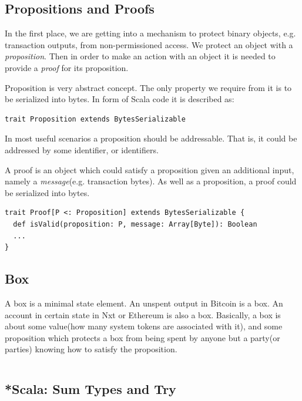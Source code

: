 \documentclass[]{report}   %
\begin{document}
\subsection{Propositions and Proofs}

In the first place, we are getting into a mechanism to protect binary objects, e.g. transaction outputs, from non-permissioned access. We protect an object with a \textit{proposition}. Then in order to make an action with an object it is needed to provide a \textit{proof} for its proposition. 

Proposition is very abstract concept. The only property we require from it is to be serialized into bytes. In form of Scala code it is described as:

\begin{lstlisting}
trait Proposition extends BytesSerializable
\end{lstlisting}

In most useful scenarios a proposition should be addressable. That is, it could be addressed by some identifier, or identifiers.

A proof is an object which could satisfy a proposition given an additional input, namely a \textit{message}(e.g. transaction bytes). As well as a proposition, a proof could be serialized into bytes. 

\begin{lstlisting}
trait Proof[P <: Proposition] extends BytesSerializable {
  def isValid(proposition: P, message: Array[Byte]): Boolean
  ...
}
\end{lstlisting}


\subsection{Box}

A box is a minimal state element. An unspent output in Bitcoin is a box. An account in certain state in Nxt or Ethereum is also a box. Basically, a box is about some value(how many system tokens are associated with it), and some proposition which protects a box from being spent by anyone but a party(or parties) knowing how to satisfy the proposition.

\begin{lstlisting}
\end{lstlisting}


\subsection{*Scala: Sum Types and Try}
\end{document}
